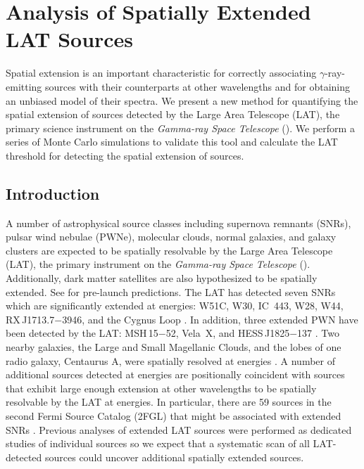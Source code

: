 
\chapter{Analysis of Spatially Extended LAT Sources}


  Spatial extension is an important characteristic for correctly
  associating $\gamma$-ray-emitting sources with their counterparts at other wavelengths
  and for obtaining an unbiased model of their spectra.  We present a new
  method for quantifying the spatial extension of sources detected by the Large
  Area Telescope (LAT), the primary science instrument on the {\em \fermi
  Gamma-ray Space Telescope} (\fermi).  We perform a series of Monte Carlo
  simulations to validate this tool and calculate the LAT threshold for
  detecting the spatial extension of sources.

\section{Introduction}

A number of astrophysical source classes including supernova remnants
(SNRs), pulsar wind nebulae (PWNe), molecular clouds, normal galaxies,
and galaxy clusters are expected to be spatially resolvable by the
Large Area Telescope (LAT), the primary instrument on the {\em
\fermi Gamma-ray Space Telescope} (\fermi).  Additionally, dark
matter satellites are also hypothesized to be spatially extended. See
\cite{atwood_2009a_large-telescope} for pre-launch predictions.  The LAT
has detected seven SNRs which are significantly extended at \gev energies:
W51C, W30, IC~443, W28, W44, RX\,J1713.7$-$3946, and the Cygnus Loop
\citep{abdo_2009a_fermi-discovery,ajello_2012a_fermi-large,abdo_2010a_observation-supernova,abdo_2010d_fermi-large,abdo_2010a_gamma-ray-emission,abdo_2011a_observations-young,katagiri_2011a_fermi-large}.
In addition, three extended PWN have been detected
by the LAT: MSH\,15$-$52, Vela~X, and HESS\,J1825$-$137
\citep{abdo_2010a_detection-energetic,abdo_2010c_fermi-large,grondin_2011_detection-pulsar}.
Two nearby galaxies, the Large and Small Magellanic Clouds, and the lobes
of one radio galaxy, Centaurus A, were spatially resolved at \gev energies
\citep{abdo_2010a_observations-large,abdo_2010a_detection-small,abdo_2010a_fermi-gamma-ray}.
A number of additional sources detected at \gev energies are positionally
coincident with sources that exhibit large enough extension at other
wavelengths to be spatially resolvable by the LAT at \gev energies.
In particular, there are 59 \gev sources in the second Fermi
Source Catalog (2FGL) that might be associated with extended SNRs
\citep[2FGL,][]{nolan_2012_fermi-large}.  Previous analyses of extended
LAT sources were performed as dedicated studies of individual sources
so we expect that a systematic scan of all LAT-detected sources could
uncover additional spatially extended sources.

